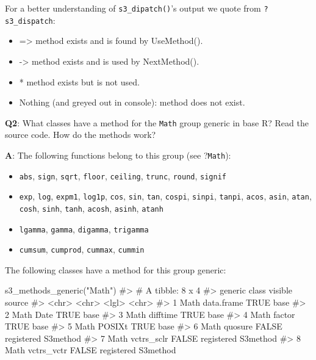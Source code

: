 \documentclass[
]{krantz}
\makeatletter
\newenvironment{Shaded}{\begin{snugshade}}{\end{snugshade}}
\newcommand{\CommentTok}[1]{\textcolor[rgb]{0.56,0.35,0.01}{\textit{#1}}}
\newcommand{\KeywordTok}[1]{\textcolor[rgb]{0.13,0.29,0.53}{\textbf{#1}}}
\newcommand{\NormalTok}[1]{#1}
\newcommand{\StringTok}[1]{\textcolor[rgb]{0.31,0.60,0.02}{#1}}
\providecommand{\tightlist}{%
  \setlength{\itemsep}{0pt}\setlength{\parskip}{0pt}}
\newenvironment{kframe}{%
\medskip{}
\setlength{\fboxsep}{.8em}
 \def\at@end@of@kframe{}%
 \ifinner\ifhmode%
  \def\at@end@of@kframe{\end{minipage}}%
  \begin{minipage}{\columnwidth}%
 \fi\fi%
 \def\FrameCommand##1{\hskip\@totalleftmargin \hskip-\fboxsep
 \colorbox{shadecolor}{##1}\hskip-\fboxsep
     \hskip-\linewidth \hskip-\@totalleftmargin \hskip\columnwidth}%
 \MakeFramed {\advance\hsize-\width
   \@totalleftmargin\z@ \linewidth\hsize
   \@setminipage}}%
 {\par\unskip\endMakeFramed%
 \at@end@of@kframe}
\renewenvironment{Shaded}{\begin{kframe}}{\end{kframe}}
\renewcommand{\KeywordTok} [1]{\textcolor[rgb]{0.00,0.44,0.13}{{#1}}}
\renewcommand{\StringTok}  [1]{\textcolor[rgb]{0.25,0.44,0.63}{{#1}}}
\renewcommand{\CommentTok} [1]{\textcolor[rgb]{0.38,0.63,0.69}{{#1}}}
\renewcommand{\NormalTok}  [1]{{#1}}
\makeatother
\begin{document}
For a better understanding of \texttt{s3\_dipatch()}'s output we quote from \texttt{?s3\_dispatch}:

\begin{itemize}
\tightlist
\item
  =\textgreater{} method exists and is found by UseMethod().
\item
  -\textgreater{} method exists and is used by NextMethod().
\item
  * method exists but is not used.
\item
  Nothing (and greyed out in console): method does not exist.
\end{itemize}

\textbf{{Q2}}: What classes have a method for the \texttt{Math} group generic in base R? Read the source code. How do the methods work?

\textbf{{A}}: The following functions belong to this group (see ?\texttt{Math}):

\begin{itemize}
\tightlist
\item
  \texttt{abs}, \texttt{sign}, \texttt{sqrt}, \texttt{floor}, \texttt{ceiling}, \texttt{trunc}, \texttt{round}, \texttt{signif}
\item
  \texttt{exp}, \texttt{log}, \texttt{expm1}, \texttt{log1p}, \texttt{cos}, \texttt{sin}, \texttt{tan}, \texttt{cospi}, \texttt{sinpi}, \texttt{tanpi}, \texttt{acos}, \texttt{asin}, \texttt{atan}, \texttt{cosh}, \texttt{sinh}, \texttt{tanh}, \texttt{acosh}, \texttt{asinh}, \texttt{atanh}
\item
  \texttt{lgamma}, \texttt{gamma}, \texttt{digamma}, \texttt{trigamma}
\item
  \texttt{cumsum}, \texttt{cumprod}, \texttt{cummax}, \texttt{cummin}
\end{itemize}

The following classes have a method for this group generic:

\begin{Shaded}
\begin{Highlighting}[]
\KeywordTok{s3_methods_generic}\NormalTok{(}\StringTok{"Math"}\NormalTok{)}
\CommentTok{#> # A tibble: 8 x 4}
\CommentTok{#>   generic class      visible source             }
\CommentTok{#>   <chr>   <chr>      <lgl>   <chr>              }
\CommentTok{#> 1 Math    data.frame TRUE    base               }
\CommentTok{#> 2 Math    Date       TRUE    base               }
\CommentTok{#> 3 Math    difftime   TRUE    base               }
\CommentTok{#> 4 Math    factor     TRUE    base               }
\CommentTok{#> 5 Math    POSIXt     TRUE    base               }
\CommentTok{#> 6 Math    quosure    FALSE   registered S3method}
\CommentTok{#> 7 Math    vctrs_sclr FALSE   registered S3method}
\CommentTok{#> 8 Math    vctrs_vctr FALSE   registered S3method}
\end{Highlighting}
\end{Shaded}
\end{document}
